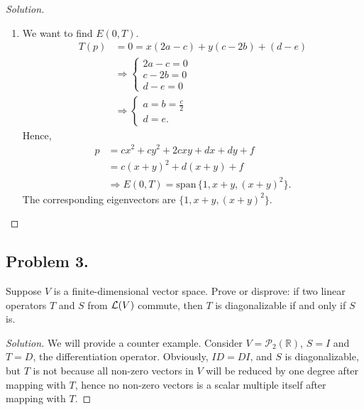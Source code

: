 \documentclass{article}
\newcommand*{\spann}{\ensuremath{\mathrm{span}}\,}
\renewcommand*{\implies}{\ensuremath{\Longrightarrow}}
\newcommand*{\R}{\ensuremath{\mathbb{R}}}
\newcommand*{\p}{\ensuremath{\mathcal{P}}}
\begin{document}
\begin{proof}[Solution]
\begin{enumerate}[label=(\alph*)]
        \item We want to find $E(0, T)$.
        \begin{align*}
            T(p) & = 0= x(2a-c) + y(c-2b) + (d-e) \\
            & \implies \begin{cases}
                2a-c = 0 \\
                c-2b = 0 \\
                d-e = 0
            \end{cases} \\
            & \implies \begin{cases}
                a = b = \frac{c}{2} \\
                d = e.
            \end{cases}
        \end{align*}
        Hence, \begin{align*}
            p & = cx^2 + cy^2 + 2cxy + dx + dy + f \\
            & = c(x+y)^2 + d(x+y) + f \\
            & \implies E(0, T) = \spann\{1, x+y, (x+y)^2\}.
        \end{align*}
        The corresponding eigenvectors are $\{1, x+y, (x+y)^2\}$.
    \end{enumerate}

\end{proof}

\newpage
\subsection*{Problem 3.}
Suppose $V$ is a finite-dimensional vector space. Prove or disprove: if two linear operators
$T$ and $S$ from ${\cal L} (V)$ commute, then $T$ is diagonalizable if and only if $S$ is.
\begin{proof}[Solution]
    We will provide a counter example. Consider $V=\p_2(\R)$, $S = I$ and $T = D$, the differentiation
    operator. Obviously, $ID = DI$, and $S$ is diagonalizable, but $T$ is not because 
    all non-zero vectors in $V$ will be reduced by one degree after mapping with $T$, hence no non-zero
    vectors is a scalar multiple itself after mapping with $T$.
\end{proof}

\newpage
\end{document}
